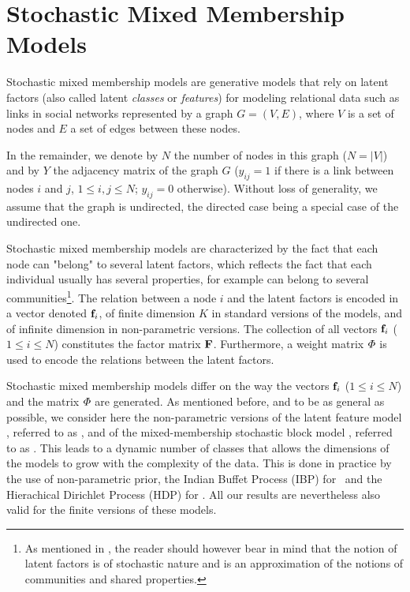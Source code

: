 \section{Stochastic Mixed Membership Models}
\label{sec:background}

Stochastic mixed membership models are generative models that rely on latent factors (also called latent \textit{classes} or \textit{features}) for modeling relational data such as links in social networks represented by a graph $G=(V,E)$, where $V$ is a set of nodes and $E$ a set of edges between these nodes.

In the remainder, we denote by $N$ the number of nodes in this graph ($N = |V|$) and by $Y$ the adjacency matrix of the graph $G$ ($y_{ij}=1$ if there is a link between nodes $i$ and $j$, $1 \le i,j \le N$; $y_{ij} = 0$ otherwise). Without loss of generality, we assume that the graph is undirected, the directed case being a special case of the undirected one.

Stochastic mixed membership models are characterized by the fact that each node can "belong" to several latent factors, which reflects the fact that each individual usually has several properties, for example can belong to several communities\footnote{As mentioned in \cite{goldenberg2010survey}, the reader should however bear in mind that the notion of latent factors is of stochastic nature and is an approximation of the notions of communities and shared properties.}. The relation between a node $i$ and the latent factors is encoded in a vector denoted $\mathbf{f}_{i}$, of finite dimension $K$ in standard versions of the models, and of infinite dimension in  non-parametric versions. The collection of all vectors $\mathbf{f}_{i}$ ($1 \le i \le N$) constitutes the factor matrix $\mathbf{F}$. Furthermore, a weight matrix $\mat{\Phi}$ is used to encode the relations between the latent factors.

Stochastic mixed membership models differ on the way the vectors $\mathbf{f}_{i}$ ($1 \le i \le N$) and the matrix $\mat{\Phi}$ are generated. As mentioned before, and to be as general as possible, we consider here the non-parametric versions of the latent feature model \cite{ILFRM}, referred to as \ifm, and of the mixed-membership stochastic block model \cite{iMMSB,fan2015dynamic}, referred to as \imb. This leads to a dynamic number of classes that allows the dimensions of the models to grow with the complexity of the data. This is done in practice by the use of non-parametric prior,  the Indian Buffet Process (IBP) for \ifm\ and the Hierachical Dirichlet Process (HDP)  for \imb. All our results are nevertheless also valid for the finite versions of these models.

